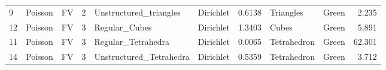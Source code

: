 \begin{tabular}{lllrllrllr}
9  &   Poisson &         FV &         2 &   Unstructured\_triangles &  Dirichlet &        0.6138 &      Triangles &                                       Green &        2.235 \\
12 &   Poisson &         FV &         3 &            Regular\_Cubes &  Dirichlet &        1.3403 &          Cubes &                                       Green &        5.891 \\
11 &   Poisson &         FV &         3 &       Regular\_Tetrahedra &  Dirichlet &        0.0065 &    Tetrahedron &                                       Green &       62.301 \\
14 &   Poisson &         FV &         3 &  Unstructured\_Tetrahedra &  Dirichlet &        0.5359 &    Tetrahedron &                                       Green &        3.712 \\
\bottomrule
\end{tabular}
